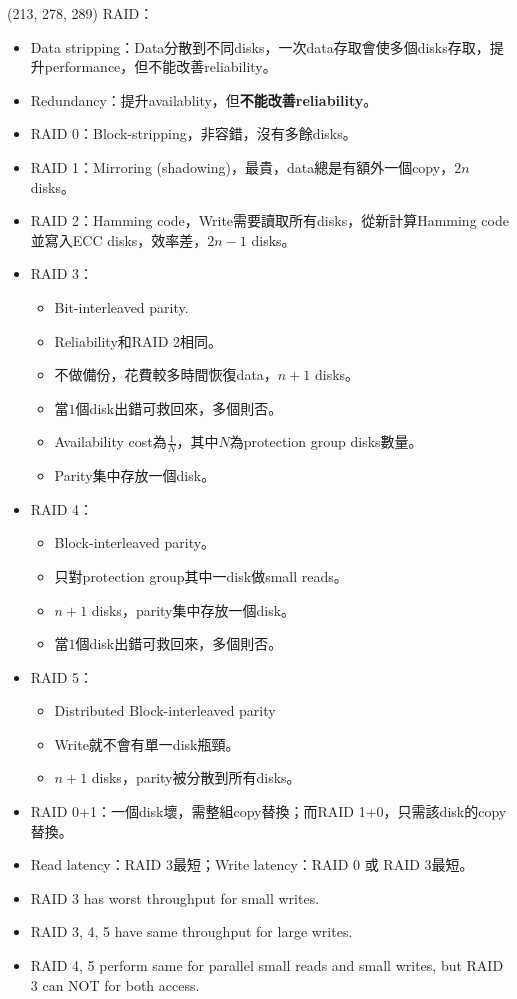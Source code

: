 \item \begin{theorem}{(213, 278, 289)} RAID：\begin{itemize}
        \item Data stripping：Data分散到不同disks，一次data存取會使多個disks存取，提升performance，但不能改善reliability。
        \item Redundancy：提升availablity，但\textbf{不能改善reliability}。
        \item RAID 0：Block-stripping，非容錯，沒有多餘disks。
        \item RAID 1：Mirroring (shadowing)，最貴，data總是有額外一個copy，$2n$ disks。
        \item RAID 2：Hamming code，Write需要讀取所有disks，從新計算Hamming code並寫入ECC disks，效率差，$2n - 1$ disks。
        \item RAID 3：\begin{itemize}
            \item Bit-interleaved parity.
            \item Reliability和RAID 2相同。
            \item 不做備份，花費較多時間恢復data，$n + 1$ disks。
            \item 當$1$個disk出錯可救回來，多個則否。
            \item Availability cost為$\frac{1}{N}$，其中$N$為protection group disks數量。
            \item Parity集中存放一個disk。
        \end{itemize}
        \item RAID 4：\begin{itemize}
            \item Block-interleaved parity。
            \item 只對protection group其中一disk做small reads。
            \item $n + 1$ disks，parity集中存放一個disk。
            \item 當$1$個disk出錯可救回來，多個則否。
        \end{itemize}
        \item RAID 5：\begin{itemize}
            \item Distributed Block-interleaved parity
            \item Write就不會有單一disk瓶頸。
            \item $n + 1$ disks，parity被分散到所有disks。
        \end{itemize}
        \item RAID 0+1：一個disk壞，需整組copy替換；而RAID 1+0，只需該disk的copy替換。
        \item Read latency：RAID 3最短；Write latency：RAID 0 或 RAID 3最短。
        \item RAID 3 has worst throughput for small writes.
        \item RAID 3, 4, 5 have same throughput for large writes.
        \item RAID 4, 5 perform same for parallel small reads and small writes, but RAID 3 can NOT for both access.
    \end{itemize}
\end{theorem}